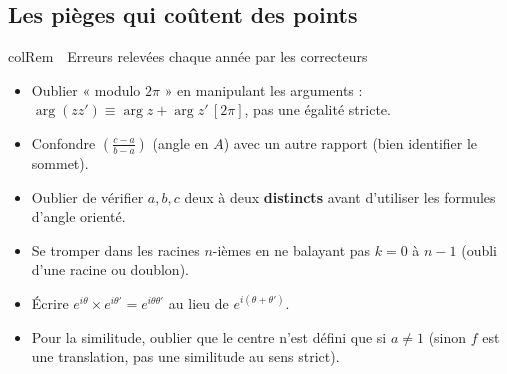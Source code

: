 \documentclass[11pt,a4paper]{article}
\newenvironment{remarque}[1][Remarque]
  {\begin{fiche}{colRem}{\ding{43}~~#1}}{\end{fiche}}
\begin{document}
\subsection{Les pièges qui coûtent des points}

\begin{remarque}[Erreurs relevées chaque année par les correcteurs]
\begin{itemize}[leftmargin=6mm, itemsep=0.5mm]
  \item Oublier « modulo $2\pi$ » en manipulant les arguments : $\arg(zz')\equiv\arg z+\arg z'\,[2\pi]$, pas une égalité stricte.
  \item Confondre $\left(\frac{c-a}{b-a}\right)$ (angle en $A$) avec un autre rapport (bien identifier le sommet).
  \item Oublier de vérifier $a,b,c$ deux à deux \textbf{distincts} avant d'utiliser les formules d'angle orienté.
  \item Se tromper dans les racines $n$-ièmes en ne balayant pas $k=0$ à $n-1$ (oubli d'une racine ou doublon).
  \item Écrire $e^{i\theta}\times e^{i\theta'}=e^{i\theta\theta'}$ au lieu de $e^{i(\theta+\theta')}$.
  \item Pour la similitude, oublier que le centre n'est défini que si $a\ne1$ (sinon $f$ est une translation, pas une similitude au sens strict).
\end{itemize}
\end{remarque}
\end{document}
